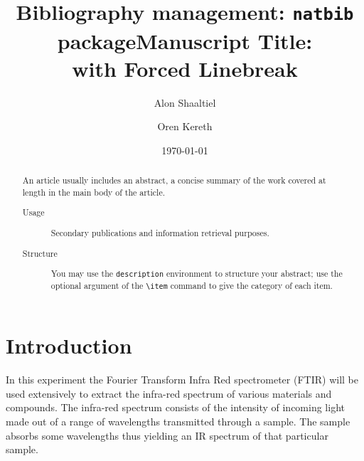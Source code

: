\documentclass[reprint,amsmath,amssymb,aps, prl]{revtex4-2}
\title{Bibliography management: \texttt{natbib} package}
\begin{document}

\title{Manuscript Title:\\with Forced Linebreak}%


\author{Alon Shaaltiel}
\author{Oren Kereth}



\date{\today}%

\begin{abstract}
An article usually includes an abstract, a concise summary of the work
covered at length in the main body of the article. 
\begin{description}
\item[Usage]
Secondary publications and information retrieval purposes.
\item[Structure]
You may use the \texttt{description} environment to structure your abstract;
use the optional argument of the \verb+\item+ command to give the category of each item. 
\end{description}
\end{abstract}

\maketitle
\renewcommand*{\thesection}{\arabic{section}}
\renewcommand*{\thesubsection}{\arabic{section}.\arabic{subsection}}

\section{Introduction}
In this experiment the Fourier Transform Infra Red spectrometer (FTIR) will be used extensively to extract the infra-red spectrum of various materials and compounds. The infra-red spectrum consists of the intensity of incoming light made out of a range of wavelengths transmitted through a sample. The sample absorbs some wavelengths thus yielding an IR spectrum of that particular sample.
\end{document}
